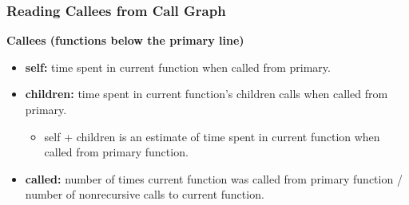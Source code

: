 \begin{frame}[fragile]
  \frametitle{Reading Callees from Call Graph}


\begin{changemargin}{1.5cm}
  
  {\bf Callees (functions below the primary line)}
  \begin{itemize}  
    \item {\bf self:} time spent in current function when called from primary.
    \item {\bf children:} time spent in current function's children calls when
      called from primary.
      \begin{itemize}
        \item self + children is an estimate of time spent in current function
          when called from primary function.
      \end{itemize}
    \item {\bf called:} number of times current function was called from primary
      function / number of nonrecursive calls to current function.
  \end{itemize}
  \end{changemargin}
\end{frame}

